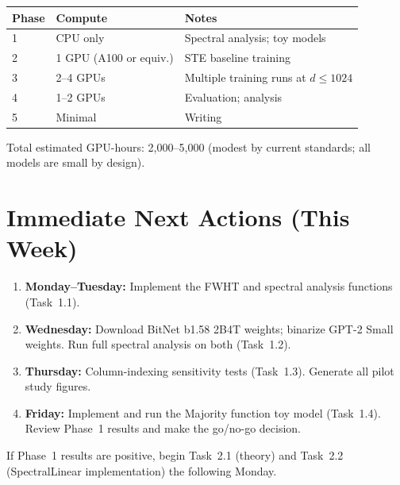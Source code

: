 \documentclass[12pt,a4paper]{article}
\begin{document}
\begin{center}
\begin{tabular}{lll}
\toprule
\textbf{Phase} & \textbf{Compute} & \textbf{Notes} \\
\midrule
1 & CPU only & Spectral analysis; toy models \\
2 & 1 GPU (A100 or equiv.) & STE baseline training \\
3 & 2--4 GPUs & Multiple training runs at $d \leq 1024$ \\
4 & 1--2 GPUs & Evaluation; analysis \\
5 & Minimal & Writing \\
\bottomrule
\end{tabular}
\end{center}

Total estimated GPU-hours: 2,000--5,000 (modest by current standards; all models are small by design).


\section{Immediate Next Actions (This Week)}\label{sec:immediate}

\begin{enumerate}
    \item \textbf{Monday--Tuesday:} Implement the FWHT and spectral analysis functions (Task~1.1).
    \item \textbf{Wednesday:} Download BitNet b1.58 2B4T weights; binarize GPT-2 Small weights. Run full spectral analysis on both (Task~1.2).
    \item \textbf{Thursday:} Column-indexing sensitivity tests (Task~1.3). Generate all pilot study figures.
    \item \textbf{Friday:} Implement and run the Majority function toy model (Task~1.4). Review Phase~1 results and make the go/no-go decision.
\end{enumerate}

If Phase~1 results are positive, begin Task~2.1 (theory) and Task~2.2 (SpectralLinear implementation) the following Monday.
\end{document}
